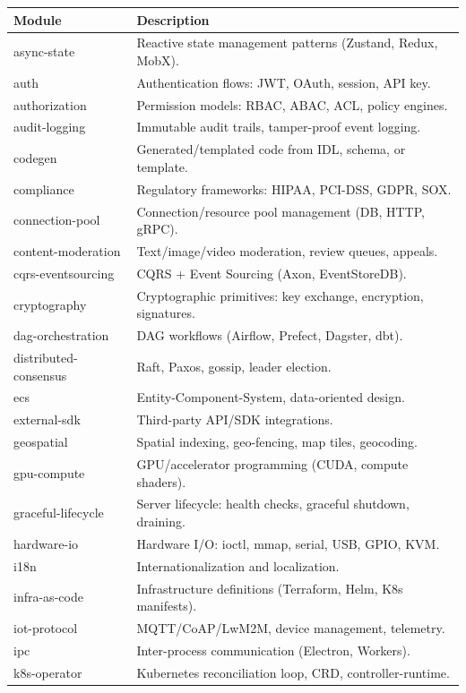 \documentclass[11pt,a4paper,openright,twoside]{report}
\begin{document}
\begin{longtable}{lp{9cm}}
\toprule
\textbf{Module} & \textbf{Description} \\
\midrule
\endhead
async-state & Reactive state management patterns (Zustand, Redux, MobX). \\
auth & Authentication flows: JWT, OAuth, session, API key. \\
authorization & Permission models: RBAC, ABAC, ACL, policy engines. \\
audit-logging & Immutable audit trails, tamper-proof event logging. \\
codegen & Generated/templated code from IDL, schema, or template. \\
compliance & Regulatory frameworks: HIPAA, PCI-DSS, GDPR, SOX. \\
connection-pool & Connection/resource pool management (DB, HTTP, gRPC). \\
content-moderation & Text/image/video moderation, review queues, appeals. \\
cqrs-eventsourcing & CQRS + Event Sourcing (Axon, EventStoreDB). \\
cryptography & Cryptographic primitives: key exchange, encryption, signatures. \\
dag-orchestration & DAG workflows (Airflow, Prefect, Dagster, dbt). \\
distributed-consensus & Raft, Paxos, gossip, leader election. \\
ecs & Entity-Component-System, data-oriented design. \\
external-sdk & Third-party API/SDK integrations. \\
geospatial & Spatial indexing, geo-fencing, map tiles, geocoding. \\
gpu-compute & GPU/accelerator programming (CUDA, compute shaders). \\
graceful-lifecycle & Server lifecycle: health checks, graceful shutdown, draining. \\
hardware-io & Hardware I/O: ioctl, mmap, serial, USB, GPIO, KVM. \\
i18n & Internationalization and localization. \\
infra-as-code & Infrastructure definitions (Terraform, Helm, K8s manifests). \\
iot-protocol & MQTT/CoAP/LwM2M, device management, telemetry. \\
ipc & Inter-process communication (Electron, Workers). \\
k8s-operator & Kubernetes reconciliation loop, CRD, controller-runtime. \\

\end{longtable}
\end{document}
